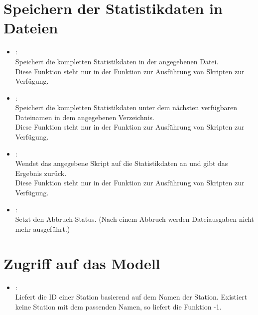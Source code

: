 \section{Speichern der Statistikdaten in Dateien}

\begin{itemize}

\item
{}:\\
Speichert die kompletten Statistikdaten in der angegebenen Datei.\\
Diese Funktion steht nur in der Funktion zur Ausführung von Skripten zur Verfügung.

\item
{}:\\
Speichert die kompletten Statistikdaten unter dem nächsten verfügbaren Dateinamen in dem angegebenen Verzeichnis.\\
Diese Funktion steht nur in der Funktion zur Ausführung von Skripten zur Verfügung.

\item
{}:\\
Wendet das angegebene Skript auf die Statistikdaten an und gibt das Ergebnis zurück.\\
Diese Funktion steht nur in der Funktion zur Ausführung von Skripten zur Verfügung.

\item
{}:\\
Setzt den Abbruch-Status. (Nach einem Abbruch werden Dateiausgaben nicht mehr ausgeführt.)

\end{itemize}

\section{Zugriff auf das Modell}

\begin{itemize}

\item
{}:\\
Liefert die ID einer Station basierend auf dem Namen der Station.
Existiert keine Station mit dem passenden Namen, so liefert die Funktion -1.

\end{itemize}



